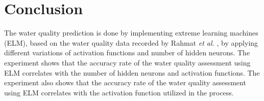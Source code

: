 \documentclass[journal,comsoc]{IEEEtran}
\let\MYoriglatexcaption\caption
\renewcommand{\caption}[2][\relax]{\MYoriglatexcaption[#2]{#2}}
\begin{document}
%



\section{Conclusion}
The water quality prediction is done by implementing extreme learning machines (ELM), based on the water quality data recorded by Rahmat {\it et al.} \cite{Rahmat16} , by applying different variations of activation functions and number of hidden neurons. The experiment shows that the accuracy rate of the water quality assessment using ELM correlates with the number of hidden neurons and activation functions. The experiment also shows that the accuracy rate of the water quality assessment using ELM correlates with the activation function utilized in the process.
\end{document}
